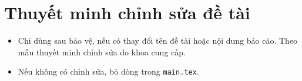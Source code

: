 \chapter*{Thuyết minh chỉnh sửa đề tài}

\begin{goiy}
  \begin{itemize}
    \item Chỉ dùng sau bảo vệ, nếu có thay đổi tên đề tài hoặc nội dung báo cáo. Theo mẫu thuyết minh chỉnh sửa do khoa cung cấp.
    \item Nếu không có chỉnh sửa, bỏ dòng \verb|| trong \texttt{main.tex}.
  \end{itemize}
\end{goiy}

